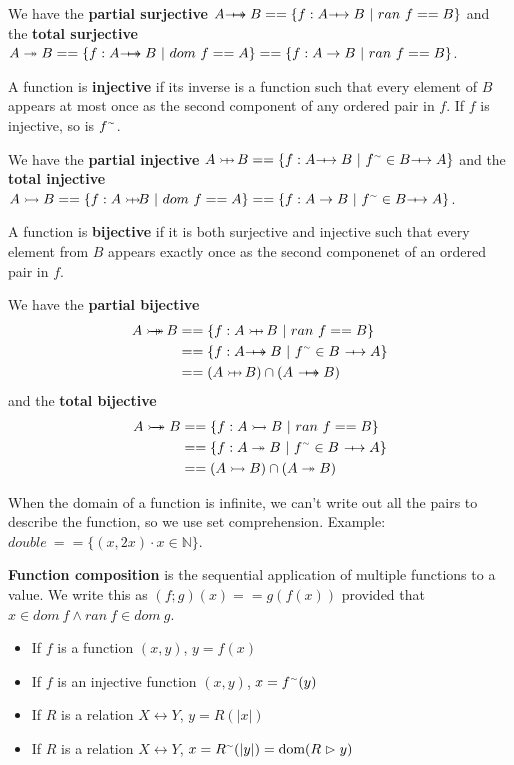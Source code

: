 \documentclass[12pt]{article}
\begin{document}
We have the {\bf partial surjective} $A \nontotalsurjective B == \{ f : A \nontotal B \suchthat ran\ f == B \}$ and the {\bf total surjective} $A \surjective B == \{ f : A \nontotalsurjective B \suchthat dom\ f == A \} == \{ f : A \function B \suchthat ran\ f == B \}$.

A function is {\bf injective} if its inverse is a function such that every element of $B$ appears at most once as the second component of any ordered pair in $f$. If $f$ is injective, so is $f^\ttilde$.

We have the {\bf partial injective} $A \nontotalinjective\ B == \{ f : A \nontotal B \suchthat f^\ttilde \in B \nontotal A \}$ and the {\bf total injective} $A \injective B == \{ f : A \nontotalinjective B \suchthat dom\ f == A \} == \{ f : A \function B \suchthat f^\ttilde \in B \nontotal A \}$.

A function is {\bf bijective} if it is both surjective and injective such that every element from $B$ appears exactly once as the second componenet of an ordered pair in $f$.

We have the {\bf partial bijective}
\begin{align*}
A \nontotalbijective\ B &== \{ f : A \nontotalinjective\ B \suchthat ran\ f == B \}\\
                        &== \{ f : A \nontotalsurjective B \suchthat f^\ttilde \in B\ \nontotal A \}\\
                        &== (A \nontotalinjective\ B) \cap (A\ \nontotalsurjective B)
\end{align*}
and the {\bf total bijective}
\begin{align*}
A \bijective B &== \{ f : A \injective B \suchthat ran\ f == B \}\\
               &== \{ f : A \surjective B \suchthat f^\ttilde \in B\ \nontotal A \}\\
               &== (A \injective B) \cap (A \surjective B)
\end{align*}

When the domain of a function is infinite, we can't write out all the pairs to describe the function, so we use set comprehension. Example: $double\ == \{ (x,2x) \cdot x \in \mathbb{N} \}$.

{\bf Function composition} is the sequential application of multiple functions to a value. We write this as $(f; g)(x) == g(f(x))$ provided that $x \in dom\ f \land ran\ f \in dom\ g$.

\begin{itemize}
\item If $f$ is a function $(x,y)$, $y = f(x)$
\item If $f$ is an injective function $(x,y)$, $x = f^\ttilde(y)$
\item If $R$ is a relation $X \leftrightarrow Y$, $y = R(|{x}|)$
\item If $R$ is a relation $X \leftrightarrow Y$, $x = R^\ttilde(|{y}|) = \text{dom}(R \vartriangleright {y})$
\end{itemize}
\end{document}
